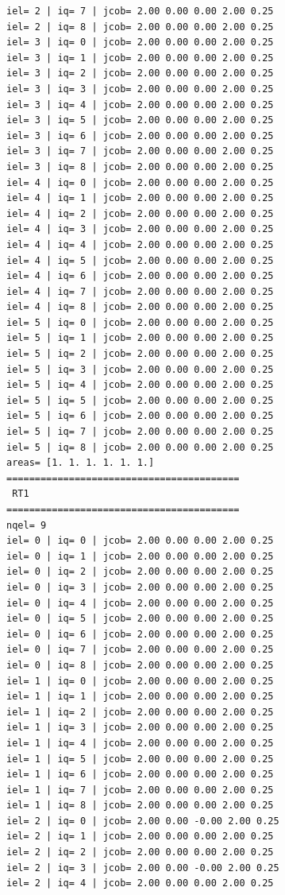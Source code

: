 \begin{tiny}
\begin{verbatim}
iel= 2 | iq= 7 | jcob= 2.00 0.00 0.00 2.00 0.25
iel= 2 | iq= 8 | jcob= 2.00 0.00 0.00 2.00 0.25
iel= 3 | iq= 0 | jcob= 2.00 0.00 0.00 2.00 0.25
iel= 3 | iq= 1 | jcob= 2.00 0.00 0.00 2.00 0.25
iel= 3 | iq= 2 | jcob= 2.00 0.00 0.00 2.00 0.25
iel= 3 | iq= 3 | jcob= 2.00 0.00 0.00 2.00 0.25
iel= 3 | iq= 4 | jcob= 2.00 0.00 0.00 2.00 0.25
iel= 3 | iq= 5 | jcob= 2.00 0.00 0.00 2.00 0.25
iel= 3 | iq= 6 | jcob= 2.00 0.00 0.00 2.00 0.25
iel= 3 | iq= 7 | jcob= 2.00 0.00 0.00 2.00 0.25
iel= 3 | iq= 8 | jcob= 2.00 0.00 0.00 2.00 0.25
iel= 4 | iq= 0 | jcob= 2.00 0.00 0.00 2.00 0.25
iel= 4 | iq= 1 | jcob= 2.00 0.00 0.00 2.00 0.25
iel= 4 | iq= 2 | jcob= 2.00 0.00 0.00 2.00 0.25
iel= 4 | iq= 3 | jcob= 2.00 0.00 0.00 2.00 0.25
iel= 4 | iq= 4 | jcob= 2.00 0.00 0.00 2.00 0.25
iel= 4 | iq= 5 | jcob= 2.00 0.00 0.00 2.00 0.25
iel= 4 | iq= 6 | jcob= 2.00 0.00 0.00 2.00 0.25
iel= 4 | iq= 7 | jcob= 2.00 0.00 0.00 2.00 0.25
iel= 4 | iq= 8 | jcob= 2.00 0.00 0.00 2.00 0.25
iel= 5 | iq= 0 | jcob= 2.00 0.00 0.00 2.00 0.25
iel= 5 | iq= 1 | jcob= 2.00 0.00 0.00 2.00 0.25
iel= 5 | iq= 2 | jcob= 2.00 0.00 0.00 2.00 0.25
iel= 5 | iq= 3 | jcob= 2.00 0.00 0.00 2.00 0.25
iel= 5 | iq= 4 | jcob= 2.00 0.00 0.00 2.00 0.25
iel= 5 | iq= 5 | jcob= 2.00 0.00 0.00 2.00 0.25
iel= 5 | iq= 6 | jcob= 2.00 0.00 0.00 2.00 0.25
iel= 5 | iq= 7 | jcob= 2.00 0.00 0.00 2.00 0.25
iel= 5 | iq= 8 | jcob= 2.00 0.00 0.00 2.00 0.25
areas= [1. 1. 1. 1. 1. 1.]
=========================================
 RT1
=========================================
nqel= 9
iel= 0 | iq= 0 | jcob= 2.00 0.00 0.00 2.00 0.25
iel= 0 | iq= 1 | jcob= 2.00 0.00 0.00 2.00 0.25
iel= 0 | iq= 2 | jcob= 2.00 0.00 0.00 2.00 0.25
iel= 0 | iq= 3 | jcob= 2.00 0.00 0.00 2.00 0.25
iel= 0 | iq= 4 | jcob= 2.00 0.00 0.00 2.00 0.25
iel= 0 | iq= 5 | jcob= 2.00 0.00 0.00 2.00 0.25
iel= 0 | iq= 6 | jcob= 2.00 0.00 0.00 2.00 0.25
iel= 0 | iq= 7 | jcob= 2.00 0.00 0.00 2.00 0.25
iel= 0 | iq= 8 | jcob= 2.00 0.00 0.00 2.00 0.25
iel= 1 | iq= 0 | jcob= 2.00 0.00 0.00 2.00 0.25
iel= 1 | iq= 1 | jcob= 2.00 0.00 0.00 2.00 0.25
iel= 1 | iq= 2 | jcob= 2.00 0.00 0.00 2.00 0.25
iel= 1 | iq= 3 | jcob= 2.00 0.00 0.00 2.00 0.25
iel= 1 | iq= 4 | jcob= 2.00 0.00 0.00 2.00 0.25
iel= 1 | iq= 5 | jcob= 2.00 0.00 0.00 2.00 0.25
iel= 1 | iq= 6 | jcob= 2.00 0.00 0.00 2.00 0.25
iel= 1 | iq= 7 | jcob= 2.00 0.00 0.00 2.00 0.25
iel= 1 | iq= 8 | jcob= 2.00 0.00 0.00 2.00 0.25
iel= 2 | iq= 0 | jcob= 2.00 0.00 -0.00 2.00 0.25
iel= 2 | iq= 1 | jcob= 2.00 0.00 0.00 2.00 0.25
iel= 2 | iq= 2 | jcob= 2.00 0.00 0.00 2.00 0.25
iel= 2 | iq= 3 | jcob= 2.00 0.00 -0.00 2.00 0.25
iel= 2 | iq= 4 | jcob= 2.00 0.00 0.00 2.00 0.25

\end{verbatim}
\end{tiny}
